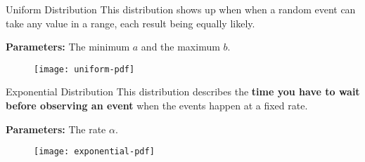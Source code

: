 %
\begin{frame}{Uniform Distribution}
This distribution shows up when when a random event can take any value in a
range, each result being equally likely.

\hfill

\textbf{Parameters:} The minimum $a$ and the maximum $b$.

  \begin{figure}
    \texttt{[image: uniform-pdf]}
  \end{figure}

\end{frame}
%

%
\begin{frame}{Exponential Distribution}
This distribution describes the \textbf{time you have to wait before observing
an event} when the events happen at a fixed rate.

\hfill

\textbf{Parameters:} The rate $\alpha$.

  \begin{figure}
    \texttt{[image: exponential-pdf]}
  \end{figure}

\end{frame}
%
